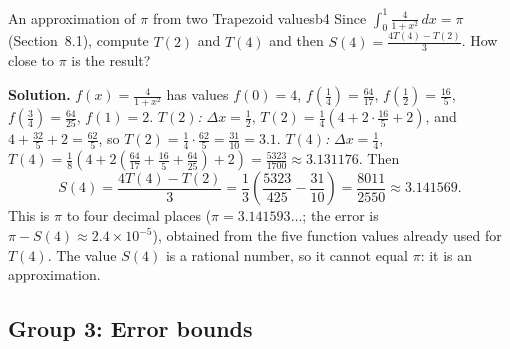 \documentclass[11pt]{article}
\begin{document}
\begin{exmp}{An approximation of $\pi$ from two Trapezoid values}{b4}
Since $\int_0^1\frac4{1+x^2}\,dx=\pi$ (Section~8.1), compute $T(2)$ and $T(4)$ and then $S(4)=\frac{4T(4)-T(2)}3$. How close to $\pi$ is the result?

\textbf{Solution.} $f(x)=\frac4{1+x^2}$ has values $f(0)=4$, $f\left(\frac14\right)=\frac{64}{17}$, $f\left(\frac12\right)=\frac{16}5$, $f\left(\frac34\right)=\frac{64}{25}$, $f(1)=2$. \emph{$T(2)$:} $\Delta x=\frac12$, $T(2)=\frac14\left(4+2\cdot\frac{16}5+2\right)$, and $4+\frac{32}5+2=\frac{62}5$, so $T(2)=\frac14\cdot\frac{62}5=\frac{31}{10}=3.1$. \emph{$T(4)$:} $\Delta x=\frac14$, $T(4)=\frac18\left(4+2\left(\frac{64}{17}+\frac{16}5+\frac{64}{25}\right)+2\right)=\frac{5323}{1700}\approx3.131176$. Then
\[S(4)=\frac{4T(4)-T(2)}3=\frac13\left(\frac{5323}{425}-\frac{31}{10}\right)=\frac{8011}{2550}\approx3.141569 .\]
This is $\pi$ to four decimal places ($\pi=3.141593\ldots$; the error is $\pi-S(4)\approx2.4\times10^{-5}$), obtained from the five function values already used for $T(4)$. The value $S(4)$ is a rational number, so it cannot equal $\pi$: it is an approximation.
\end{exmp}

\subsection*{Group 3: Error bounds}
\end{document}
